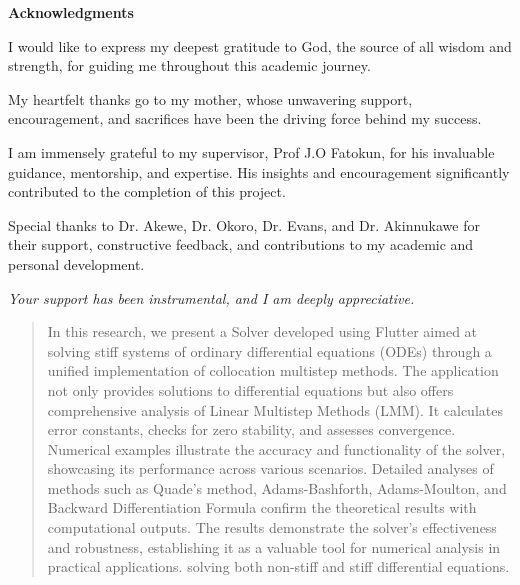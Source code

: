 \documentclass[a4paper, twoside]{report} %
\begin{document}
\begin{titlepage}
  
  \vspace*{2cm}
  \begin{center}
    {\LARGE\textbf{Acknowledgments}}
  \end{center}
 
  
  \vspace{1cm}
  \large
  I would like to express my deepest gratitude to God, the source of all wisdom and strength, for guiding me throughout this academic journey.

  \vspace{0.5cm}
  My heartfelt thanks go to my mother, whose unwavering support, encouragement, and sacrifices have been the driving force behind my success.

  \vspace{0.5cm}
  I am immensely grateful to my supervisor, Prof J.O Fatokun, for his invaluable guidance, mentorship, and expertise. His insights and encouragement significantly contributed to the completion of this project.

  \vspace{0.5cm}
  Special thanks to Dr. Akewe, Dr. Okoro, Dr. Evans, and Dr. Akinnukawe for their support, constructive feedback, and contributions to my academic and personal development.

  \vspace{2cm}
  \textit{Your support has been instrumental, and I am deeply appreciative.}
\end{titlepage}

\begin{abstract}
  In this research, we present a Solver developed using Flutter aimed at solving stiff systems of ordinary differential equations (ODEs) through a unified implementation of collocation multistep methods. The application not only provides solutions to differential equations but also offers comprehensive analysis of Linear Multistep Methods (LMM). It calculates error constants, checks for zero stability, and assesses convergence. Numerical examples illustrate the accuracy and functionality of the solver, showcasing its performance across various scenarios. Detailed analyses of methods such as Quade’s method, Adams-Bashforth, Adams-Moulton, and Backward Differentiation Formula confirm the theoretical results with computational outputs. The results demonstrate the solver's effectiveness and robustness, establishing it as a valuable tool for numerical analysis in practical applications. solving both non-stiff and stiff differential equations.
  \end{abstract}
\end{document}
